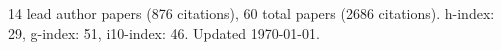 14 lead author papers (876 citations),
60 total papers (2686 citations).\newline
h-index: 29, g-index: 51, i10-index: 46. Updated \today.